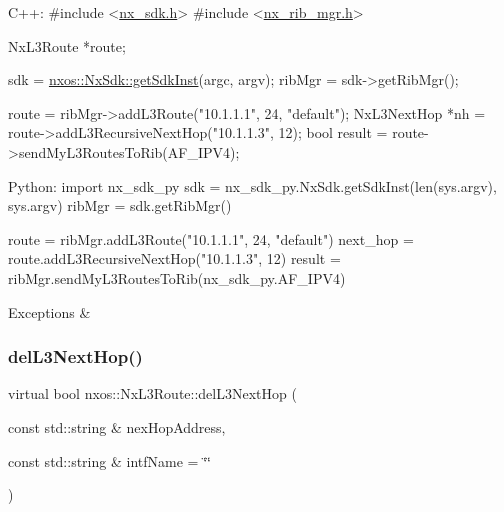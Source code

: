 \begin{DoxyCode}
C++:
\textcolor{preprocessor}{     #include <\mbox{\hyperlink{nx__sdk_8h}{nx\_sdk.h}}>}
\textcolor{preprocessor}{     #include <\mbox{\hyperlink{nx__rib__mgr_8h}{nx\_rib\_mgr.h}}>}

     NxL3Route    *route;

     sdk = \mbox{\hyperlink{classnxos_1_1_nx_sdk_a5050e2d26c40744b4fc7862068a83f39}{nxos::NxSdk::getSdkInst}}(argc, argv);
     ribMgr = sdk->getRibMgr();

     route = ribMgr->addL3Route(\textcolor{stringliteral}{"10.1.1.1"}, 24, \textcolor{stringliteral}{"default"});
     NxL3NextHop *nh = route->addL3RecursiveNextHop(\textcolor{stringliteral}{"10.1.1.3"}, 12);
     \textcolor{keywordtype}{bool} result = route->sendMyL3RoutesToRib(AF\_IPV4);

Python:
     \textcolor{keyword}{import} nx\_sdk\_py
     sdk = nx\_sdk\_py.NxSdk.getSdkInst(len(sys.argv), sys.argv)
     ribMgr = sdk.getRibMgr()

     route = ribMgr.addL3Route(\textcolor{stringliteral}{"10.1.1.1"}, 24, \textcolor{stringliteral}{"default"})
     next\_hop = route.addL3RecursiveNextHop(\textcolor{stringliteral}{"10.1.1.3"}, 12)
     result = ribMgr.sendMyL3RoutesToRib(nx\_sdk\_py.AF\_IPV4)
\end{DoxyCode}



\begin{DoxyExceptions}{Exceptions}
{\em } & \\
\hline
\end{DoxyExceptions}
\mbox{\label{classnxos_1_1_nx_l3_route_a8c0708c54d5bb8ce94f80e0edd43880c}} 
\subsubsection{\texorpdfstring{del\+L3\+Next\+Hop()}{delL3NextHop()}}
{\footnotesize\ttfamily virtual bool nxos\+::\+Nx\+L3\+Route\+::del\+L3\+Next\+Hop (\begin{DoxyParamCaption}\item[{const std\+::string \&}]{nex\+Hop\+Address,  }\item[{const std\+::string \&}]{intf\+Name = {\ttfamily \char`\"{}\char`\"{}} }\end{DoxyParamCaption})\hspace{0.3cm}{\ttfamily [pure virtual]}}

